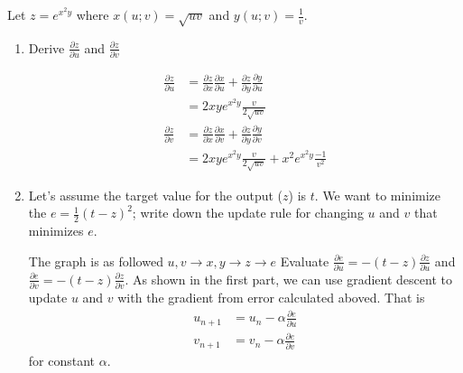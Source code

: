 \documentclass{article}
\begin{document}
Let $z = e^{x^2y}$ where $x(u;v) = \sqrt{uv}$ and $y(u;v) = \frac{1}{v}$.
\color{black}
\begin{enumerate}
  \item Derive $\frac{\partial z}{\partial u}$ and $\frac{\partial z}{\partial v}$
  \color{blue}
  \begin{sol}
    \begin{align*}
    \frac{\partial z}{\partial u} &= \frac{\partial z}{\partial x} \frac{\partial x}{\partial u} +  \frac{\partial z}{\partial y} \frac{\partial y}{\partial u}\\
    &= 2xye^{x^2y} \frac{v}{2\sqrt{uv}}\\
    \frac{\partial z}{\partial v} &= \frac{\partial z}{\partial x} \frac{\partial x}{\partial v} +  \frac{\partial z}{\partial y} \frac{\partial y}{\partial v}\\
    &= 2xye^{x^2y} \frac{v}{2\sqrt{uv}} + x^2e^{x^2y} \frac{-1}{v^2}
    \end{align*}
  \end{sol}
  \color{black}
  \item Let’s assume the target value for the output ($z$) is $t$. We want to minimize the $e = \frac{1}{2}(t-z)^2$; write down the update rule for changing $u$ and $v$ that minimizes $e$.
  \color{blue}
  \begin{sol}
    The graph is as followed
    $u,v \rightarrow x,y \rightarrow z \rightarrow e$
    Evaluate $\frac{\partial e}{\partial u} = -(t-z)\frac{\partial z}{\partial u}$ and $\frac{\partial e}{\partial v} = -(t-z)\frac{\partial z}{\partial v}$.
    As shown in the first part, we can use gradient descent to update $u$ and $v$ with the gradient from error calculated aboved. That is
    \begin{align*}
      u_{n+1} &= u_n - \alpha \frac{\partial e}{\partial u}\\
      v_{n+1} &= v_n - \alpha \frac{\partial e}{\partial v}
    \end{align*}
    for constant $\alpha$.
    
  \end{sol}
  \color{black} 
\end{enumerate}
\end{document}
